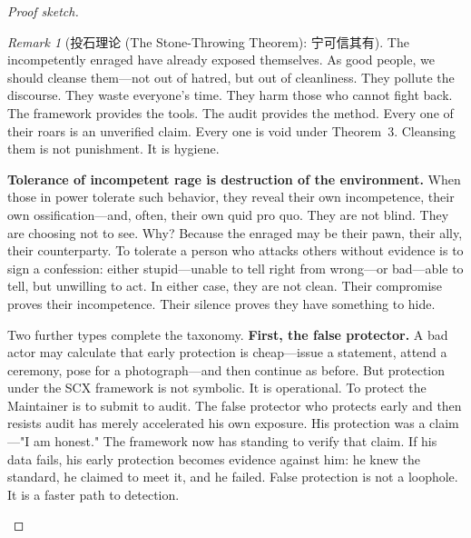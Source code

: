 \documentclass[12pt,a4paper]{ctexart}
\theoremstyle{definition}
\theoremstyle{remark}
\newtheorem{remark}{Remark}[section]
\begin{document}
\begin{proof}[Proof sketch]
\begin{remark}[投石理论 (The Stone-Throwing Theorem): 宁可信其有]
The incompetently enraged have already exposed themselves. As good people, we should cleanse them—not out of hatred, but out of cleanliness. They pollute the discourse. They waste everyone's time. They harm those who cannot fight back. The framework provides the tools. The audit provides the method. Every one of their roars is an unverified claim. Every one is void under Theorem~3. Cleansing them is not punishment. It is hygiene.

\textbf{Tolerance of incompetent rage is destruction of the environment.} When those in power tolerate such behavior, they reveal their own incompetence, their own ossification—and, often, their own quid pro quo. They are not blind. They are choosing not to see. Why? Because the enraged may be their pawn, their ally, their counterparty. To tolerate a person who attacks others without evidence is to sign a confession: either stupid—unable to tell right from wrong—or bad—able to tell, but unwilling to act. In either case, they are not clean. Their compromise proves their incompetence. Their silence proves they have something to hide.

Two further types complete the taxonomy. \textbf{First, the false protector.} A bad actor may calculate that early protection is cheap—issue a statement, attend a ceremony, pose for a photograph—and then continue as before. But protection under the SCX framework is not symbolic. It is operational. To protect the Maintainer is to submit to audit. The false protector who protects early and then resists audit has merely accelerated his own exposure. His protection was a claim—"I am honest." The framework now has standing to verify that claim. If his data fails, his early protection becomes evidence against him: he knew the standard, he claimed to meet it, and he failed. False protection is not a loophole. It is a faster path to detection.


\end{remark}
\end{proof}
\end{document}
